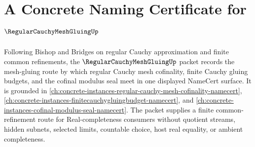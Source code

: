\chapter{A Concrete Naming Certificate for $\RegularCauchyMeshGluingUp$}
\label{ch:concrete-instances-regular-cauchy-mesh-gluing-namecert}

Following Bishop and Bridges on regular Cauchy approximation and finite common refinements, the $\RegularCauchyMeshGluingUp$ packet records the mesh-gluing route by which regular Cauchy mesh cofinality, finite Cauchy gluing budgets, and the cofinal modulus seal meet in one displayed NameCert surface. It is grounded in \autoref{ch:concrete-instances-regular-cauchy-mesh-cofinality-namecert}, \autoref{ch:concrete-instances-finitecauchygluingbudget-namecert}, and \autoref{ch:concrete-instances-cofinal-modulus-seal-namecert}. The packet supplies a finite common-refinement route for Real-completeness consumers without quotient streams, hidden subnets, selected limits, countable choice, host real equality, or ambient completeness.

